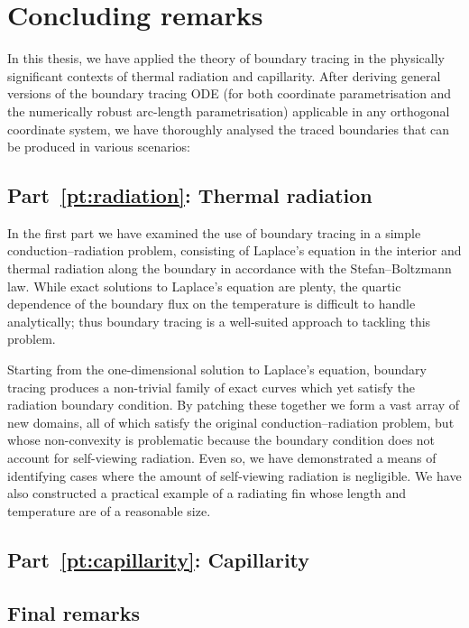 \chapter{Concluding remarks}
\label{ch:concluding}

In this thesis,
we have applied the theory of boundary tracing
in the physically significant contexts
of thermal radiation and capillarity.
After deriving general versions of the boundary tracing ODE
(for both coordinate parametrisation
and the numerically robust arc-length parametrisation)
applicable in any orthogonal coordinate system,
we have thoroughly analysed
the traced boundaries that can be produced in various scenarios:

\section{Part~\ref*{pt:radiation}: Thermal radiation}
\label{sec:concluding.radiation}

In the first part we have examined the use of boundary tracing
in a simple conduction--radiation problem,
consisting of Laplace's equation in the interior
and thermal radiation along the boundary
in accordance with the Stefan--Boltzmann law.
While exact solutions to Laplace's equation are plenty,
the quartic dependence of the boundary flux on the temperature
is difficult to handle analytically;
thus boundary tracing is a well-suited approach to tackling this problem.

Starting from the one-dimensional solution to Laplace's equation,
boundary tracing produces a non-trivial family of exact curves
which yet satisfy the radiation boundary condition.
By patching these together
we form a vast array of new domains,
all of which satisfy the original conduction--radiation problem,
but whose non-convexity is problematic
because the boundary condition does not account for self-viewing radiation.
Even so, we have demonstrated a means of identifying cases
where the amount of self-viewing radiation is negligible.
We have also constructed a practical example of a radiating fin
whose length and temperature are of a reasonable size.


\section{Part~\ref*{pt:capillarity}: Capillarity}
\label{sec:concluding.capillarity}

\section{Final remarks}
\label{sec:concluding.final}
